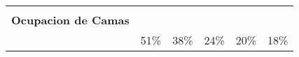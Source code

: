 \begin{tabular}{l|ccccc|}
	\textbf{} &
	\multicolumn{1}{c|}{\cellcolor[HTML]{FCE4D6}} &
	\multicolumn{1}{c|}{\cellcolor[HTML]{EDEDED}} &
	\multicolumn{1}{c|}{\cellcolor[HTML]{DDEBF7}} &
	\multicolumn{1}{c|}{\cellcolor[HTML]{E2EFDA}} &
	\cellcolor[HTML]{FFF2CC} \\
	\textbf{Ocupacion de Camas} &
	\multicolumn{1}{c|}{\cellcolor[HTML]{FCE4D6}} &
	\multicolumn{1}{c|}{\cellcolor[HTML]{EDEDED}} &
	\multicolumn{1}{c|}{\cellcolor[HTML]{DDEBF7}} &
	\multicolumn{1}{c|}{\cellcolor[HTML]{E2EFDA}} &
	\cellcolor[HTML]{FFF2CC} \\
	&
	\multicolumn{1}{c|}{\multirow{-3}{*}{\cellcolor[HTML]{FCE4D6}51\%}} &
	\multicolumn{1}{c|}{\multirow{-3}{*}{\cellcolor[HTML]{EDEDED}38\%}} &
	\multicolumn{1}{c|}{\multirow{-3}{*}{\cellcolor[HTML]{DDEBF7}24\%}} &
	\multicolumn{1}{c|}{\multirow{-3}{*}{\cellcolor[HTML]{E2EFDA}20\%}} &
	\multirow{-3}{*}{\cellcolor[HTML]{FFF2CC}18\%} \\ \hline
\end{tabular}